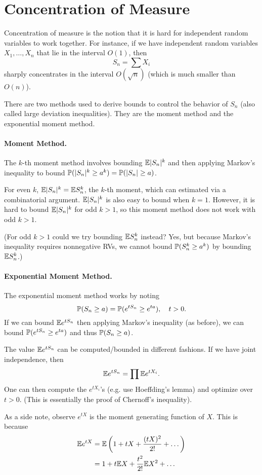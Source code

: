 \section{Concentration of Measure}

Concentration of measure is the notion that it is hard for independent random variables to work together. For instance, if we have independent random variables $X_1, \dots, X_n$ that lie in the interval $O(1)$, then
\[
    S_n = \sum X_i
\]
sharply concentrates in the interval $O(\sqrt{n})$ (which is much smaller than $O(n)$).

There are two methods used to derive bounds to control the behavior of $S_n$ (also called large deviation inequalities). They are the moment method and the exponential moment method.

\paragraph{Moment Method.} The $k$-th moment method involves bounding ${\mathbb E} |S_n|^k$ and then applying Markov's inequality to bound ${\mathbb P}(|S_n|^k \geq a^k) = {\mathbb P}(|S_n| \geq a)$.

For even $k$, ${\mathbb E}|S_n|^k = {\mathbb E} S_n^k$, the $k$-th moment, which can estimated via a combinatorial argument. ${\mathbb E}|S_n|^k$ is also easy to bound when $k = 1$. However, it is hard to bound ${\mathbb E}|S_n|^k$ for odd $k > 1$, so this moment method does not work with odd $k > 1$.

(For odd $k > 1$ could we try bounding ${\mathbb E} S_n^k$ instead? Yes, but because Markov's inequality requires nonnegative RVs, we cannot bound ${\mathbb P}(S_n^k \geq a^k) $ by bounding ${\mathbb E} S_n^k$.)

\paragraph{Exponential Moment Method.} The exponential moment method works by noting
\[
    {\mathbb P}(S_n \geq a) = {\mathbb P}( e^{tS_n} \geq e^{ta}), \quad t > 0.
\]
If we can bound ${\mathbb E} e^{tS_n}$ then applying Markov's inequality (as before), we can bound ${\mathbb P}( e^{tS_n} \geq e^{ta})$ and thus ${\mathbb P}(S_n \geq a)$.

The value ${\mathbb E} e^{tS_n}$ can be computed/bounded in different fashions. If we have joint independence, then
\[
    {\mathbb E} e^{tS_n} = \prod {\mathbb E} e^{tX_i}.
\]
One can then compute the $e^{tX_i}$'s (e.g. use Hoeffding's lemma) and optimize over $t > 0$. (This is essentially the proof of Chernoff's inequality).

As a side note, observe $e^{tX}$ is the moment generating function of $X$. This is because
\[
    \begin{split}
        {\mathbb E} e^{tX} & = {\mathbb E} \left( 1 + tX + \frac{(tX)^2}{2!} + \dots \right) \\
                   & = 1 + t{\mathbb E} X + \frac{t^2}{2!}{\mathbb E} X^2 + \dots
    \end{split}
\]

